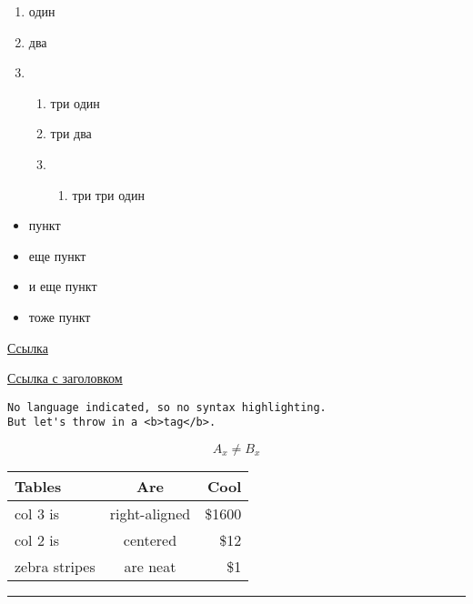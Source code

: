 \begin{enumerate}
\def\labelenumi{\arabic{enumi}.}
\item
  один
\item
  два
\item
  \begin{enumerate}
  \def\labelenumii{\arabic{enumii}.}
  \item
    три один
  \item
    три два
  \item
    \begin{enumerate}
    \def\labelenumiii{\arabic{enumiii}.}
    \tightlist
    \item
      три три один
    \end{enumerate}
  \end{enumerate}
\end{enumerate}

\begin{itemize}
\item
  пункт
\item
  еще пункт
\item
  и еще пункт
\item
  тоже пункт
\end{itemize}

\href{https://www.youtube.com/watch?v=dQw4w9WgXcQ}{Ссылка}

\href{https://www.youtube.com/watch?v=dQw4w9WgXcQ}{Ссылка с заголовком}

\begin{Shaded}
\begin{Highlighting}[]
\OperatorTok{=} \OperatorTok{;}
\OperatorTok{;}
\end{Highlighting}
\end{Shaded}

\begin{Shaded}
\begin{Highlighting}[]
\OperatorTok{=} 
\end{Highlighting}
\end{Shaded}

\begin{verbatim}
No language indicated, so no syntax highlighting. 
But let's throw in a <b>tag</b>.
\end{verbatim}

\[A_x \neq B_x\]

\begin{longtable}[]{@{}lcr@{}}
\toprule
Tables & Are & Cool\tabularnewline
\midrule
\endhead
col 3 is & right-aligned & \$1600\tabularnewline
col 2 is & centered & \$12\tabularnewline
zebra stripes & are neat & \$1\tabularnewline
\bottomrule
\end{longtable}

\begin{center}\rule{0.5\linewidth}{\linethickness}\end{center}
